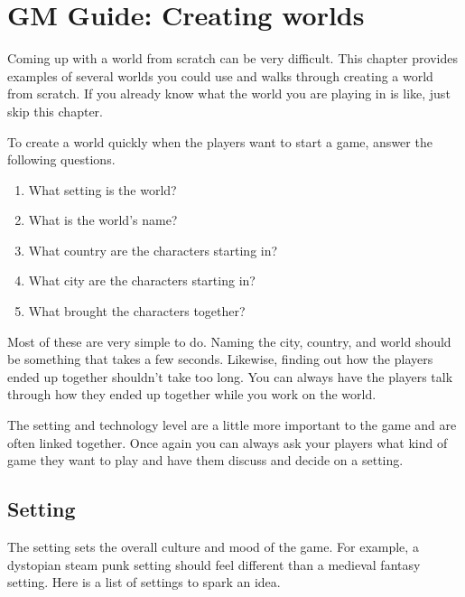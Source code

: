 \chapter{GM Guide: Creating worlds}

Coming up with a world from scratch can be very difficult. This chapter provides
examples of several worlds you could use and walks through creating a world
from scratch. If you already know what the world you are playing in is like,
just skip this chapter.

To create a world quickly when the players want to start a game, answer the
following questions.

\begin{enumerate}

    \item{What setting is the world?}
    \item{What is the world's name?}
    \item{What country are the characters starting in?}
    \item{What city are the characters starting in?}
    \item{What brought the characters together?}

\end{enumerate}

Most of these are very simple to do. Naming the city, country, and world should
be something that takes a few seconds. Likewise, finding out how the players
ended up together shouldn't take too long. You can always have the players
talk through how they ended up together while you work on the world.

The setting and technology level are a little more important to the game and
are often linked together. Once again you can always ask your players what kind
of game they want to play and have them discuss and decide on a setting.

\section*{Setting}

The setting sets the overall culture and mood of the game. For example,
a dystopian steam punk setting should feel different than a medieval fantasy
setting. Here is a list of settings to spark an idea.

